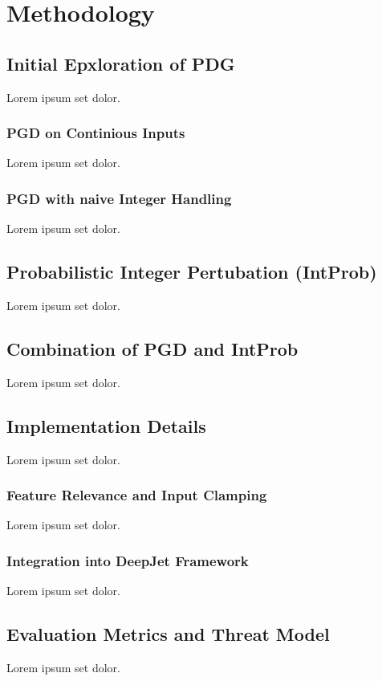 \chapter{Methodology}

\section{Initial Epxloration of PDG}
Lorem ipsum set dolor.

\subsection{PGD on Continious Inputs}
Lorem ipsum set dolor.

\subsection{PGD with naive Integer Handling}
Lorem ipsum set dolor.

\section{Probabilistic Integer Pertubation (IntProb)}
Lorem ipsum set dolor.

\section{Combination of PGD and IntProb}
Lorem ipsum set dolor.

\section{Implementation Details}
Lorem ipsum set dolor.

\subsection{Feature Relevance and Input Clamping}
Lorem ipsum set dolor.

\subsection{Integration into DeepJet Framework}
Lorem ipsum set dolor.

\section{Evaluation Metrics and Threat Model}
Lorem ipsum set dolor.

